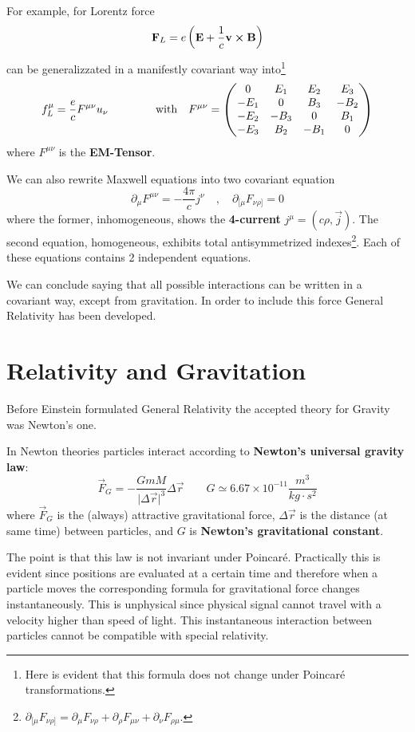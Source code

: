 \documentclass[../main/main.tex]{subfiles}
\begin{document}
For example, for Lorentz force
\[\mathbf F_L=e\left(\mathbf E+\frac1c\mathbf v\cross\mathbf B\right)\]
can be generalizzated in a manifestly covariant way into\footnote{Here is evident that this formula does not change under Poincaré transformations.}
\[f^\mu_L=\frac ecF^{\mu\nu}u_\nu\hspace{1.5cm}\text{with}\quad F^{\mu\nu}=
\begin{pmatrix}0&E_1&E_2&E_3\\-E_1&0&B_3&-B_2\\-E_2&-B_3&0&B_1\\-E_3&B_2&-B_1&0\end{pmatrix}\]
where $F^{\mu\nu}$ is the \textbf{EM-Tensor}.

We can also rewrite Maxwell equations into two covariant equation
\[\partial_\mu F^{\mu\nu}=-\frac{4\pi}{c}j^\nu\quad,\quad\partial_{[\mu}F_{\nu\rho]}=0\]
where the former, inhomogeneous, shows the \textbf{4-current} $j^\mu=(c\rho, \vec j)$. The second equation, homogeneous, exhibits total antisymmetrized indexes\footnote{$\partial_{[\mu}F_{\nu\rho]}=\partial_{\mu}F_{\nu\rho}+\partial_\rho F_{\mu\nu}+\partial_\nu F_{\rho\mu}$.}. Each of these equations contains 2 independent equations.


We can conclude saying that all possible interactions can be written in a covariant way, except from gravitation. In order to include this force General Relativity has been developed.




\section{Relativity and Gravitation}

Before Einstein formulated General Relativity the accepted theory for Gravity was Newton's one.

In Newton theories particles interact according to \textbf{Newton's universal gravity law}:
\[\vec F_G=-\frac{GmM}{\vert\Delta\vec r\vert^3}\Delta\vec r\qquad G\simeq6.67\times10^{-11} \frac{m^3}{kg\cdot s^2} \]
where $\vec F_G$ is the (always) attractive gravitational force, $\Delta\vec r$ is the distance (at same time) between particles, and $G$ is \textbf{Newton's gravitational constant}.

The point is that this law is not invariant under Poincaré. Practically this is evident since positions are evaluated at a certain time and therefore when a particle moves the corresponding formula for gravitational force changes instantaneously. This is unphysical since physical signal cannot travel with a velocity higher than  speed of light. This instantaneous interaction between particles cannot be compatible with special relativity.
\end{document}
